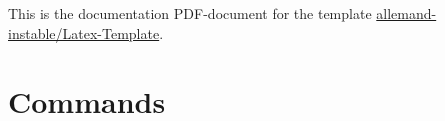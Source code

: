 \documentclass[11pt]{article}
\begin{document}
	\tableofcontents
	
	\vspace{8cm}
	This is the documentation PDF-document for the template \href{https://www.github.com/allemand-instable/Latex-Template}{allemand-instable/Latex-Template}.
	
	

	\section{Commands}
	
	
		
	
	
	

	

	
	
	
\end{document}
